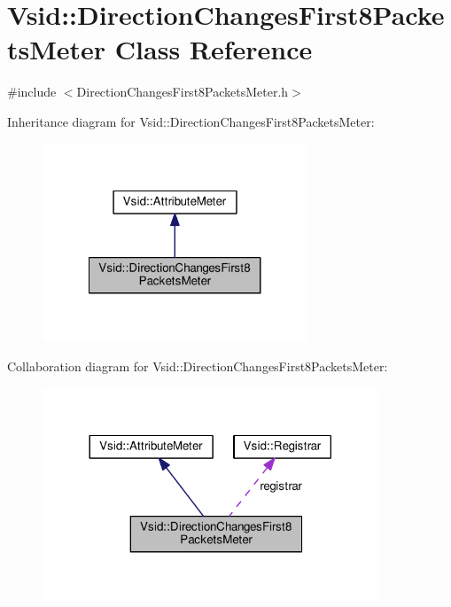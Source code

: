 \hypertarget{class_vsid_1_1_direction_changes_first8_packets_meter}{\section{Vsid\-:\-:Direction\-Changes\-First8\-Packets\-Meter Class Reference}
\label{class_vsid_1_1_direction_changes_first8_packets_meter}
}


{\ttfamily \#include $<$Direction\-Changes\-First8\-Packets\-Meter.\-h$>$}



Inheritance diagram for Vsid\-:\-:Direction\-Changes\-First8\-Packets\-Meter\-:
\nopagebreak
\begin{figure}[H]
\begin{center}
\leavevmode
\includegraphics[width=224pt]{class_vsid_1_1_direction_changes_first8_packets_meter__inherit__graph}
\end{center}
\end{figure}


Collaboration diagram for Vsid\-:\-:Direction\-Changes\-First8\-Packets\-Meter\-:
\nopagebreak
\begin{figure}[H]
\begin{center}
\leavevmode
\includegraphics[width=284pt]{class_vsid_1_1_direction_changes_first8_packets_meter__coll__graph}
\end{center}
\end{figure}
